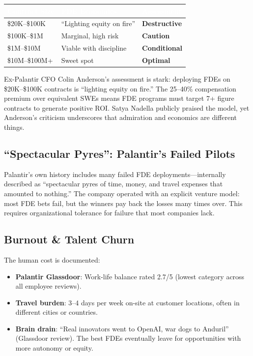 \begin{center}
\begin{tabular}{L{4cm}L{4cm}L{4.5cm}}
\toprule
{}
\textcolor{white}{\textbf{Contract Size}} &
\textcolor{white}{\textbf{FDE Economics}} &
\textcolor{white}{\textbf{Assessment}} \\
\midrule
\$20K--\$100K &
    ``Lighting equity on fire'' &
    \textcolor{msred}{\textbf{Destructive}} \\
\$100K--\$1M &
    Marginal, high risk &
    \textcolor{msorange}{\textbf{Caution}} \\
\$1M--\$10M &
    Viable with discipline &
    \textcolor{msyellow}{\textbf{Conditional}} \\
\$10M--\$100M+ &
    Sweet spot &
    \textcolor{msgreen}{\textbf{Optimal}} \\
\bottomrule
\end{tabular}
\end{center}

\vspace{4pt}
Ex-Palantir CFO Colin Anderson's assessment is stark: deploying FDEs on
\$20K--\$100K contracts is ``lighting equity on fire.'' The 25--40\%
compensation premium over equivalent SWEs means FDE programs must target
7+ figure contracts to generate positive ROI. Satya Nadella publicly
praised the model, yet Anderson's criticism underscores that admiration
and economics are different things.

\subsection{``Spectacular Pyres'': Palantir's Failed Pilots}

Palantir's own history includes many failed FDE deployments---internally
described as ``spectacular pyres of time, money, and travel expenses that
amounted to nothing.'' The company operated with an explicit venture
model: most FDE bets fail, but the winners pay back the losses many times
over. This requires organizational tolerance for failure that most
companies lack.

\subsection{Burnout \& Talent Churn}

The human cost is documented:

\begin{itemize}
    \item \textbf{Palantir Glassdoor}: Work-life balance rated 2.7/5
        (lowest category across all employee reviews).
    \item \textbf{Travel burden}: 3--4 days per week on-site at customer
        locations, often in different cities or countries.
    \item \textbf{Brain drain}: ``Real innovators went to OpenAI, war
        dogs to Anduril'' (Glassdoor review). The best FDEs eventually
        leave for opportunities with more autonomy or equity.
\end{itemize}


